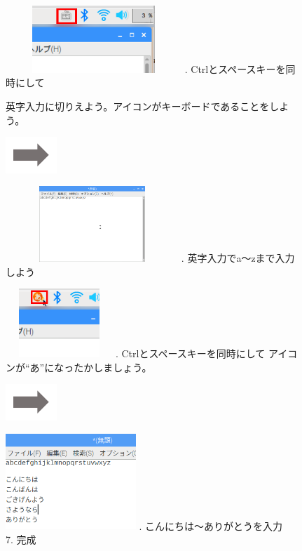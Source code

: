 \documentclass[a4paper,12pt]{jarticle}
\begin{document}
\begin{figure}[ht]
  \begin{minipage}{7.238cm}
    \includegraphics[width=6.643cm,height=2.533cm]{textbook-img059.png}
    . Ctrlとスペースキーを同時にして

    英字入力に切りえよう。アイコンがキーボードであることをしよう。
  \end{minipage}
  \includegraphics[width=1.919cm,height=1.365cm]{textbook-img053.png}
  \begin{minipage}{7.351cm}
    \includegraphics[width=6.514cm,height=2.856cm]{textbook-img061.png}
    . 英字入力でa〜zまで入力しよう
  \end{minipage}

  \begin{minipage}{6.73cm}
    \includegraphics[width=4.029cm,height=2.586cm]{textbook-img062.png}
    . Ctrlとスペースキーを同時にして
    アイコンが“あ”になったかしましょう。
  \end{minipage}
  \includegraphics[width=1.919cm,height=1.365cm]{textbook-img053.png}
  \begin{minipage}{6.589cm}
    \includegraphics[width=4.914cm,height=3.616cm]{textbook-img060.png}
    . こんにちは〜ありがとうを入力\\
    7. 完成
  \end{minipage}




\end{figure}
\end{document}

